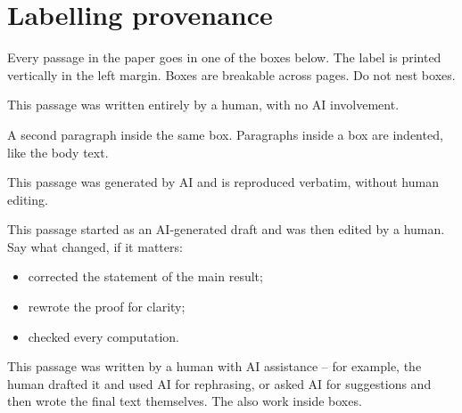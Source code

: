 \documentclass[11pt]{article}
\theoremstyle{plain}
\theoremstyle{definition}
\theoremstyle{remark}
\begin{document}
\section{Labelling provenance}
\label{sec:provenance}

Every passage in the paper goes in one of the boxes below. The label is
printed vertically in the left margin. Boxes are breakable across pages.
Do not nest boxes.

\begin{humanblock}
This passage was written entirely by a human, with no AI involvement.

A second paragraph inside the same box. Paragraphs inside a box are
indented, like the body text.
\end{humanblock}

\begin{aiblock}
This passage was generated by AI and is reproduced verbatim, without
human editing.
\end{aiblock}

\begin{editedaiblock}
This passage started as an AI-generated draft and was then edited by a
human. Say what changed, if it matters:
\begin{itemize}
  \item corrected the statement of the main result;
  \item rewrote the proof for clarity;
  \item checked every computation.
\end{itemize}
\end{editedaiblock}

\begin{aiassistedblock}
This passage was written by a human with AI assistance -- for example,
the human drafted it and used AI for rephrasing, or asked AI for
suggestions and then wrote the final text themselves. The
 also work inside boxes.
\end{aiassistedblock}
\end{document}
